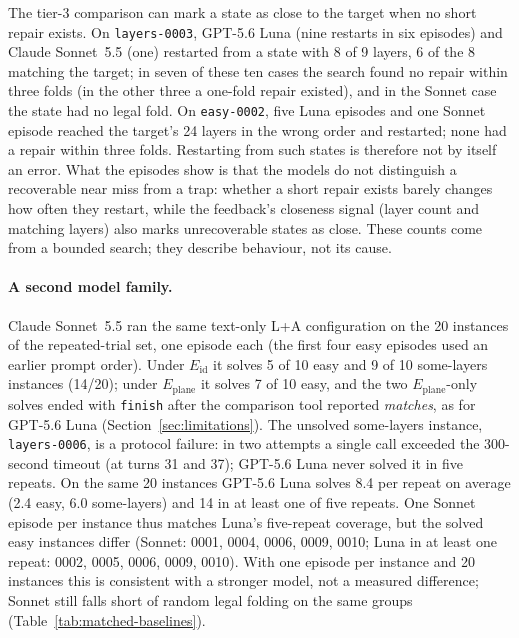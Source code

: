 The tier-3 comparison can mark a state as close to the target when no short repair exists. On
\texttt{layers-0003}, GPT-5.6 Luna (nine restarts in six episodes) and Claude Sonnet~5.5 (one)
restarted from a state with 8 of 9 layers, 6 of the 8 matching the target; in seven of these ten
cases the search found no repair within three folds (in the other three a one-fold repair
existed), and in the Sonnet case the state had no legal fold. On \texttt{easy-0002}, five Luna
episodes and one Sonnet episode reached the target's 24 layers in the wrong order and restarted;
none had a repair within three folds. Restarting from such states is therefore not by itself an
error. What the episodes show is that the models do not distinguish a recoverable near miss from a
trap: whether a short repair exists barely changes how often they restart, while the feedback's closeness signal (layer count and matching layers)
also marks unrecoverable states as close. These counts come from a bounded search; they describe
behaviour, not its cause.

\paragraph{A second model family.} Claude Sonnet~5.5 ran the same text-only L+A configuration on
the 20 instances of the repeated-trial set, one episode each (the first four easy episodes used an
earlier prompt order). Under $E_{\mathrm{id}}$ it solves 5 of 10 easy and 9 of 10 some-layers
instances (14/20); under $E_{\mathrm{plane}}$ it solves 7 of 10 easy, and the two
$E_{\mathrm{plane}}$-only solves ended with \texttt{finish} after the comparison tool reported
\emph{matches}, as for GPT-5.6 Luna (Section~\ref{sec:limitations}). The unsolved some-layers
instance, \texttt{layers-0006}, is a protocol failure: in two attempts a single call exceeded the
300-second timeout (at turns 31 and 37); GPT-5.6 Luna never solved it in five repeats. On the same
20 instances GPT-5.6 Luna solves 8.4 per repeat on average (2.4 easy, 6.0 some-layers) and 14 in at
least one of five repeats. One Sonnet episode per instance thus matches Luna's five-repeat
coverage, but the solved easy instances differ (Sonnet: 0001, 0004, 0006, 0009, 0010; Luna in at
least one repeat: 0002, 0005, 0006, 0009, 0010). With one episode per instance and 20 instances
this is consistent with a stronger model, not a measured difference; Sonnet still falls short of
random legal folding on the same groups (Table~\ref{tab:matched-baselines}).





